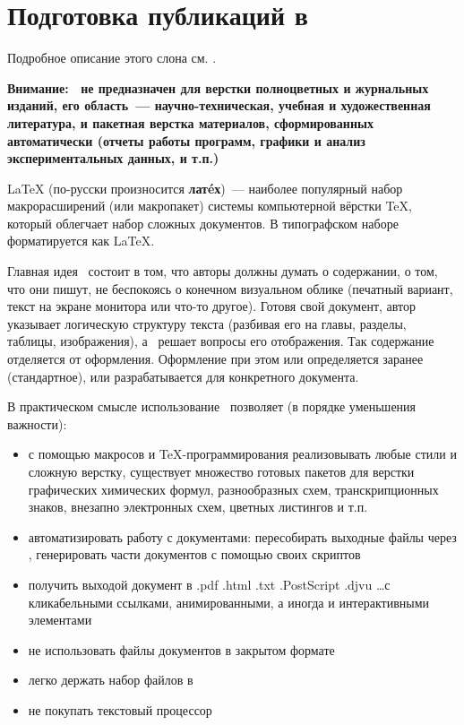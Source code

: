 \part{Подготовка публикаций в \latex}

Подробное описание этого слона см. \cite{lvovsky}.
\bigskip

\textbf{Внимание: \latex\ не предназначен для верстки полноцветных и журнальных
изданий, его область\ --- научно-техническая, учебная и художественная
литература, и пакетная верстка материалов, сформированных автоматически (отчеты
работы программ, графики и анализ экспериментальных данных, и т.п.)}
\bigskip


LaTeX (по-русски произносится \textbf{лат\'eх})\ --- наиболее популярный набор
макрорасширений (или макропакет) системы компьютерной вёрстки \TeX, который
облегчает набор сложных документов. В типографском наборе форматируется как
\LaTeX.

Главная идея \latex\ состоит в том, что авторы должны думать о содержании, о
том, что они пишут, не беспокоясь о конечном визуальном облике (печатный
вариант, текст на экране монитора или что-то другое). Готовя свой документ,
автор указывает логическую структуру текста (разбивая его на главы, разделы,
таблицы, изображения), а \latex\ решает вопросы его отображения. Так содержание
отделяется от оформления. Оформление при этом или определяется заранее
(стандартное), или разрабатывается для конкретного документа.

В практическом смысле использование \latex\ позволяет (в порядке уменьшения
важности):
\begin{itemize}
  \item с помощью макросов и \TeX-программирования реализовывать любые стили и
  сложную верстку, существует множество готовых пакетов для верстки графических
  химических формул, разнообразных схем, транскрипционных знаков, внезапно
  электронных схем, цветных листингов и т.п.
  \item автоматизировать работу с документами: пересобирать выходные файлы через
  \make, генерировать части документов с помощью своих скриптов
  \item получить выходой документ в .pdf .html .txt .PostScript .djvu \ldots с
  кликабельными ссылками, анимированными, а иногда и интерактивными элементами
  \item не использовать файлы документов в закрытом формате
  \item легко держать набор файлов в \vcs
  \item не покупать текстовый процессор
\end{itemize}

